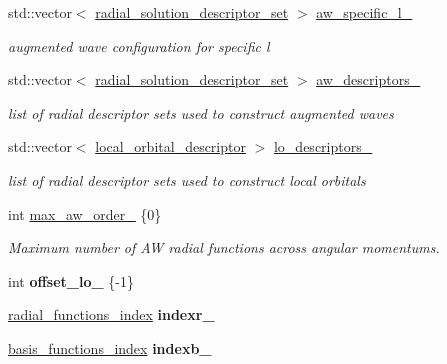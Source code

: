 \begin{DoxyCompactItemize}
std\+::vector$<$ \hyperlink{descriptors_8h_aec4b6e691d842d5c6b06552800a478b3}{radial\+\_\+solution\+\_\+descriptor\+\_\+set} $>$ \hyperlink{classsirius_1_1_atom__type_abc7f9502315e24d07ef9b5078e1fa25a}{aw\+\_\+specific\+\_\+l\+\_\+}
\begin{DoxyCompactList}\small\item\em augmented wave configuration for specific l \end{DoxyCompactList}\item 
std\+::vector$<$ \hyperlink{descriptors_8h_aec4b6e691d842d5c6b06552800a478b3}{radial\+\_\+solution\+\_\+descriptor\+\_\+set} $>$ \hyperlink{classsirius_1_1_atom__type_a8e525b6cc881daedb13d9a882c190873}{aw\+\_\+descriptors\+\_\+}
\begin{DoxyCompactList}\small\item\em list of radial descriptor sets used to construct augmented waves \end{DoxyCompactList}\item 
std\+::vector$<$ \hyperlink{structlocal__orbital__descriptor}{local\+\_\+orbital\+\_\+descriptor} $>$ \hyperlink{classsirius_1_1_atom__type_a246365cd7339aec55dd3667359d07497}{lo\+\_\+descriptors\+\_\+}
\begin{DoxyCompactList}\small\item\em list of radial descriptor sets used to construct local orbitals \end{DoxyCompactList}\item 
int \hyperlink{classsirius_1_1_atom__type_adc566d46112ed3e773d0124abaaa6882}{max\+\_\+aw\+\_\+order\+\_\+} \{0\}
\begin{DoxyCompactList}\small\item\em Maximum number of A\+W radial functions across angular momentums. \end{DoxyCompactList}\item 
\hypertarget{classsirius_1_1_atom__type_afc4db00bac5bedc9fb90eabf982d163a}{}int {\bfseries offset\+\_\+lo\+\_\+} \{-\/1\}\label{classsirius_1_1_atom__type_afc4db00bac5bedc9fb90eabf982d163a}

\item 
\hypertarget{classsirius_1_1_atom__type_acefbdde63939f9ba69955295349c544a}{}\hyperlink{classsirius_1_1radial__functions__index}{radial\+\_\+functions\+\_\+index} {\bfseries indexr\+\_\+}\label{classsirius_1_1_atom__type_acefbdde63939f9ba69955295349c544a}

\item 
\hypertarget{classsirius_1_1_atom__type_a9b672e3eb3e8ea33d18c8ee4d41fa940}{}\hyperlink{classsirius_1_1basis__functions__index}{basis\+\_\+functions\+\_\+index} {\bfseries indexb\+\_\+}\label{classsirius_1_1_atom__type_a9b672e3eb3e8ea33d18c8ee4d41fa940}


\end{DoxyCompactItemize}
